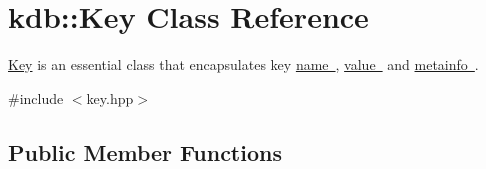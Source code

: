 \hypertarget{classkdb_1_1Key}{}\section{kdb\+::Key Class Reference}
\label{classkdb_1_1Key}


\mbox{\hyperlink{classkdb_1_1Key}{Key}} is an essential class that encapsulates key \mbox{\hyperlink{group__keyname}{name }}, \mbox{\hyperlink{group__keyvalue}{value }} and \mbox{\hyperlink{group__keymeta}{metainfo }}.  




{\ttfamily \#include $<$key.\+hpp$>$}

\subsection*{Public Member Functions}
